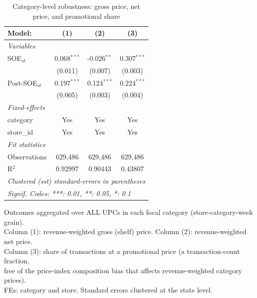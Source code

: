 
\begin{table}[htbp]
   \caption{\label{tab:category_price_promo} Category-level robustness: gross price, net price, and promotional share}
   \centering
   \begin{tabular}{lccc}
      \tabularnewline \midrule \midrule
      Model:          & (1)           & (2)           & (3)\\  
      \midrule
      \emph{Variables}\\
      SOE$_{st}$      & 0.068$^{***}$ & -0.026$^{**}$ & 0.307$^{***}$\\   
                      & (0.011)       & (0.007)       & (0.003)\\   
      Post-SOE$_{st}$ & 0.197$^{***}$ & 0.124$^{***}$ & 0.224$^{***}$\\   
                      & (0.005)       & (0.003)       & (0.004)\\   
      \midrule
      \emph{Fixed-effects}\\
      category        & Yes           & Yes           & Yes\\  
      store\_id       & Yes           & Yes           & Yes\\  
      \midrule
      \emph{Fit statistics}\\
      Observations    & 629,486       & 629,486       & 629,486\\  
      R$^2$           & 0.92997       & 0.90443       & 0.43807\\  
      \midrule \midrule
      \multicolumn{4}{l}{\emph{Clustered (sst) standard-errors in parentheses}}\\
      \multicolumn{4}{l}{\emph{Signif. Codes: ***: 0.01, **: 0.05, *: 0.1}}\\
   \end{tabular}
   
   \par \raggedright 
   Outcomes aggregated over ALL UPCs in each focal category (store-category-week grain).\\
   Column (1): revenue-weighted gross (shelf) price. Column (2): revenue-weighted net price.\\
   Column (3): share of transactions at a promotional price (a transaction-count fraction,\\
   free of the price-index composition bias that affects revenue-weighted category prices).\\
   FEs: category and store. Standard errors clustered at the state level.
\end{table}


